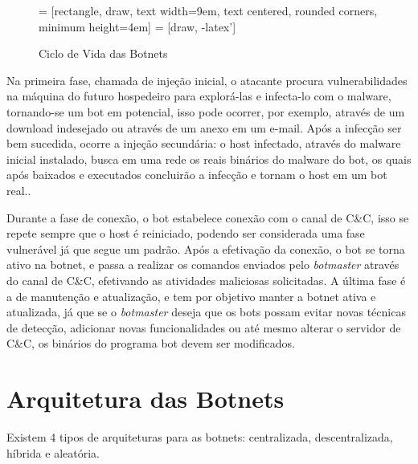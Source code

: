 \begin{figure}
 = [rectangle, draw, text width=9em, text centered, rounded corners, minimum height=4em]
 = [draw, -latex']
\centering
{}
\caption[Ciclo de Vida das Botnets]{Ciclo de Vida das Botnets} \label{fig:botnets_lifecycle}
\end{figure}

Na primeira fase, chamada de injeção inicial, o atacante procura vulnerabilidades na máquina do futuro hospedeiro para explorá-las e infecta-lo com o malware, tornando-se um bot em potencial, isso pode ocorrer, por exemplo, através de um download indesejado ou através de um anexo em um e-mail. Após a infecção ser bem sucedida, ocorre a injeção secundária: o host infectado, através do malware inicial instalado, busca em uma rede os reais binários do malware do bot, os quais após baixados e executados concluirão a infecção e tornam o host em um bot real.\cite{feily2009survey}.

Durante a fase de conexão, o bot estabelece conexão com o canal de C\&C, isso se repete sempre que o host é reiniciado, podendo ser considerada uma fase vulnerável já que segue um padrão. Após a efetivação da conexão, o bot se torna ativo na botnet, e passa a realizar os comandos enviados pelo \textit{botmaster} através do canal de C\&C, efetivando as atividades maliciosas solicitadas. A última fase é a de manutenção e atualização, e tem por objetivo manter a botnet ativa e atualizada, já que se o \textit{botmaster} deseja que os bots possam evitar novas técnicas de detecção, adicionar novas funcionalidades ou até mesmo alterar o servidor de C\&C, os binários do programa bot devem ser modificados.

\section{Arquitetura das Botnets}
Existem 4 tipos de arquiteturas para as botnets: centralizada, descentralizada, híbrida e aleatória. 


